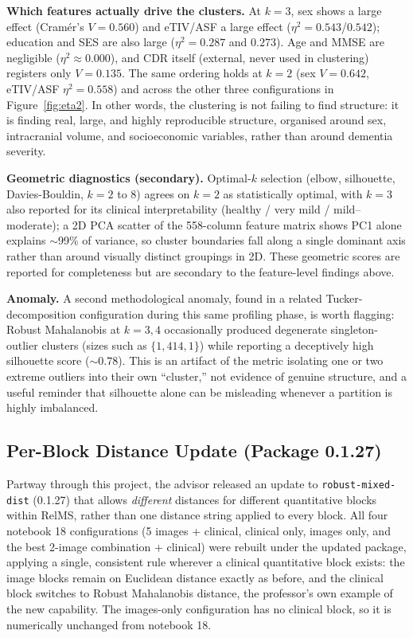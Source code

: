 \documentclass[11pt, a4paper]{article}
\begin{document}
\noindent \textbf{Which features actually drive the clusters.} At $k=3$, sex shows a large effect
(Cram\'er's $V=0.560$) and eTIV/ASF a large effect ($\eta^2=0.543$/$0.542$); education and SES are
also large ($\eta^2=0.287$ and $0.273$). Age and MMSE are negligible ($\eta^2\approx0.000$), and
CDR itself (external, never used in clustering) registers only $V=0.135$. The same ordering
holds at $k=2$ (sex $V=0.642$, eTIV/ASF $\eta^2=0.558$) and across the other three configurations in
Figure~\ref{fig:eta2}. In other words, the clustering is not failing to find structure: it is
finding real, large, and highly reproducible structure, organised around sex, intracranial volume,
and socioeconomic variables, rather than around dementia severity.

\noindent \textbf{Geometric diagnostics (secondary).} Optimal-$k$ selection (elbow, silhouette,
Davies-Bouldin, $k=2$ to $8$) agrees on $k=2$ as statistically optimal, with $k=3$ also reported for
its clinical interpretability (healthy / very mild / mild--moderate); a 2D PCA scatter of the
558-column feature matrix shows PC1 alone explains $\sim$99\% of variance, so cluster boundaries
fall along a single dominant axis rather than around visually distinct groupings in 2D. These
geometric scores are reported for completeness but are secondary to the feature-level findings
above.

\noindent \textbf{Anomaly.} A second methodological anomaly, found in a related Tucker-decomposition
configuration during this same profiling phase, is worth flagging: Robust Mahalanobis at $k=3,4$
occasionally produced degenerate singleton-outlier clusters (sizes such as $\{1, 414, 1\}$) while
reporting a deceptively high silhouette score ($\sim0.78$). This is an artifact of the metric
isolating one or two extreme outliers into their own ``cluster,'' not evidence of genuine structure,
and a useful reminder that silhouette alone can be misleading whenever a partition is highly
imbalanced.

\subsection{Per-Block Distance Update (Package 0.1.27)}
\label{sec:perblock}

Partway through this project, the advisor released an update to \texttt{robust-mixed-dist} (0.1.27)
that allows \emph{different} distances for different quantitative blocks within RelMS, rather than
one distance string applied to every block. All four notebook 18 configurations (5 images +
clinical, clinical only, images only, and the best 2-image combination + clinical) were rebuilt
under the updated package, applying a single, consistent rule wherever a clinical quantitative block
exists: the image blocks remain on Euclidean distance exactly as before, and the clinical block
switches to Robust Mahalanobis distance, the professor's own example of the new capability. The
images-only configuration has no clinical block, so it is numerically unchanged from notebook 18.
\end{document}
